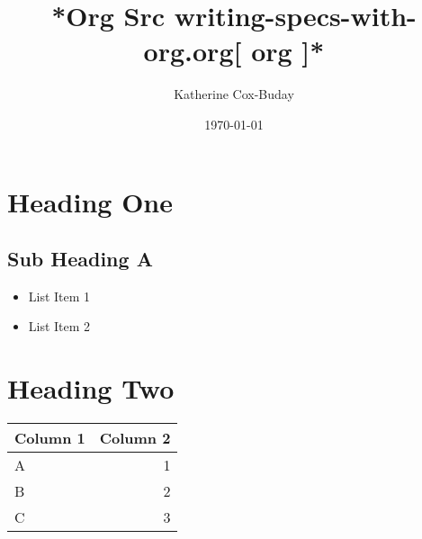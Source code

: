 \documentclass[11pt]{article}
\author{Katherine Cox-Buday}
\date{\today}
\title{*Org Src writing-specs-with-org.org[ org ]*}
\begin{document}
\maketitle
\tableofcontents

\label{org-header}

\section*{Heading One}
\label{sec-1}

\subsection*{Sub Heading A}
\label{sec-1-1}
\begin{itemize}
\item List Item 1
\item List Item 2
\end{itemize}

\section*{Heading Two}
\label{sec-2}

\begin{center}
\begin{tabular}{lr}
Column 1 & Column 2\\
\hline
A & 1\\
B & 2\\
C & 3\\
\hline
\end{tabular}
\end{center}
\end{document}
